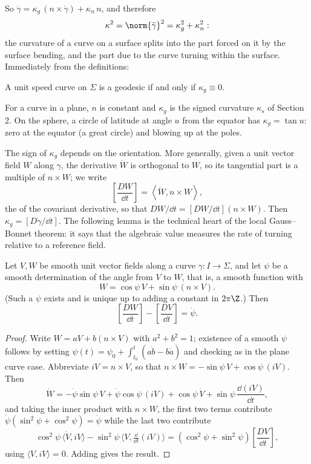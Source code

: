 So $\ddot\gamma = \kappa_g\, (n\times\dot\gamma) + \kappa_n \,n$, and therefore
$$
\kappa^2 = \norm{\ddot\gamma}^2 = \kappa_g^2 + \kappa_n^2 :
$$
the curvature of a curve on a surface splits into the part forced on it by the surface bending, and the part due to the curve turning within the surface. Immediately from the definitions:

\begin{proposition}
    A unit speed curve on $\Sigma$ is a geodesic if and only if $\kappa_g \equiv 0$.
\end{proposition}

\begin{example}
    For a curve in a plane, $n$ is constant and $\kappa_g$ is the signed curvature $\kappa_s$ of Section 2. On the sphere, a circle of latitude at angle $u$ from the equator has $\kappa_g = \tan u$: zero at the equator (a great circle) and blowing up at the poles.
\end{example}

The sign of $\kappa_g$ depends on the orientation. More generally, given a unit vector field $W$ along $\gamma$, the derivative $\dot W$ is orthogonal to $W$, so its tangential part is a multiple of $n\times W$; we write
$$
\left[\frac{DW}{\dd t}\right] = \left\langle \dot W, n\times W\right\rangle,
$$
the  of the covariant derivative, so that $DW/\dd t = [DW/\dd t](n\times W)$. Then $\kappa_g = [D\dot\gamma/\dd t]$. The following lemma is the technical heart of the local Gauss--Bonnet theorem: it says that the algebraic value measures the rate of turning relative to a reference field.

\begin{lemma}
    Let $V, W$ be smooth unit vector fields along a curve $\gamma: I \rightarrow \Sigma$, and let $\psi$ be a smooth determination of the angle from $V$ to $W$, that is, a smooth function with
    $$
    W = \cos\psi\, V + \sin\psi\, (n \times V).
    $$
    (Such a $\psi$ exists and is unique up to adding a constant in $2\pi\Z$.) Then
    $$
    \left[\frac{DW}{\dd t}\right] - \left[\frac{DV}{\dd t}\right] = \dot \psi.
    $$
\end{lemma}
\begin{proof}
    Write $W = aV + b(n\times V)$ with $a^2+b^2 = 1$; existence of a smooth $\psi$ follows by setting $\psi(t) = \psi_0 + \int_{t_0}^t (a\dot b - b \dot a)$ and checking as in the plane curve case. Abbreviate $iV = n\times V$, so that $n \times W = -\sin\psi\, V + \cos\psi\, (iV)$. Then
    $$
    \dot W = -\dot\psi\sin\psi\, V + \dot\psi\cos\psi\,(iV) + \cos\psi\,\dot V + \sin\psi\,\frac{\dd (iV)}{\dd t},
    $$
    and taking the inner product with $n\times W$, the first two terms contribute $\dot\psi(\sin^2\psi+\cos^2\psi) = \dot\psi$ while the last two contribute
    $$
    \cos^2\psi\,\langle \dot V, iV\rangle - \sin^2\psi\,\langle V, \tfrac{\dd}{\dd t}(iV)\rangle = \left(\cos^2\psi+\sin^2\psi\right)\left[\frac{DV}{\dd t}\right],
    $$
    using $\langle V, iV\rangle = 0$. Adding gives the result.
\end{proof}


